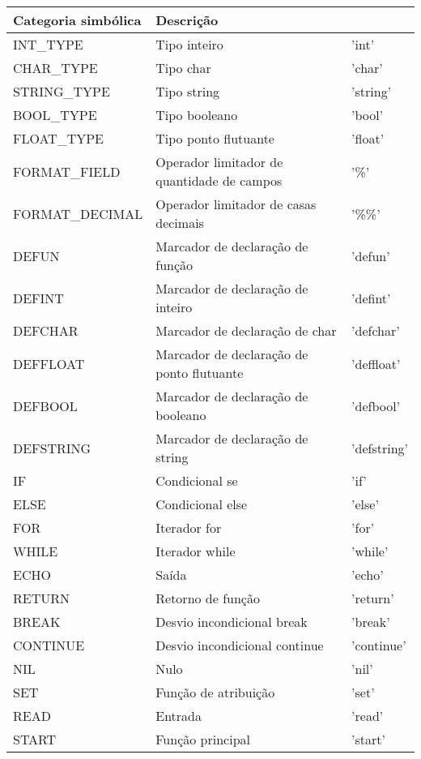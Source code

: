 \documentclass[
  12pt,				%
  oneside,			%
  a4paper,			%
  english,			%
  french,				%
  spanish,			%
  brazil,				%
]{abntex2}
\begin{document}
\begin{table}[H]
  \centering
\begin{tabularx}{16cm}{|X|X|X|}
\hline
Categoria simbólica & Descrição    \\ \hline
INT\_TYPE           & Tipo inteiro & 'int' \\
CHAR\_TYPE          & Tipo char   & 'char'  \\
STRING\_TYPE          &   Tipo string & 'string'  \\
BOOL\_TYPE          &   Tipo booleano & 'bool' \\
FLOAT\_TYPE          &   Tipo ponto flutuante & 'float' \\
FORMAT\_FIELD          &   Operador limitador de quantidade de campos
& '\%' \\
FORMAT\_DECIMAL          &   Operador limitador de casas decimais  &
'\%\%' \\
DEFUN          &   Marcador de declaração de função  & 'defun' \\
DEFINT          &   Marcador de declaração de inteiro & 'defint'  \\
DEFCHAR          &   Marcador de declaração de char & 'defchar'  \\
DEFFLOAT          &   Marcador de declaração de ponto flutuante & 'deffloat' \\
DEFBOOL           & Marcador de declaração de booleano & 'defbool' \\
DEFSTRING           & Marcador de declaração de string & 'defstring' \\
IF           & Condicional se & 'if' \\
ELSE           & Condicional else & 'else' \\
FOR           & Iterador for & 'for' \\
WHILE           & Iterador while & 'while' \\
ECHO           & Saída & 'echo' \\
RETURN           & Retorno de função & 'return' \\
BREAK           & Desvio incondicional break & 'break' \\
CONTINUE           & Desvio incondicional continue & 'continue' \\
NIL           & Nulo & 'nil' \\
SET           & Função de atribuição & 'set' \\
READ           & Entrada & 'read' \\
START           & Função principal & 'start' \\

\end{tabularx}
\end{table}
\end{document}
